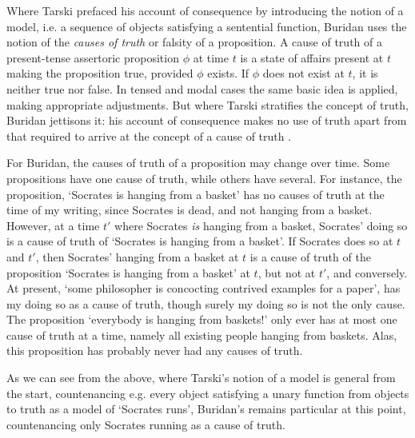 \documentclass[]{article}
\begin{document}
Where Tarski prefaced his account of consequence by introducing the notion of a model, i.e. a sequence of objects satisfying a sentential function, Buridan uses the notion of the \textit{causes of truth} or falsity of a proposition. A cause of truth of a present-tense assertoric proposition $\phi$ at time $t$ is a state of affairs present at $t$ making the proposition true, provided $\phi$ exists. If $\phi$ does not exist at $t$, it is neither true nor false. In tensed and modal cases the same basic idea is applied, making appropriate adjustments. But where Tarski stratifies the concept of truth, Buridan jettisons it: his account of consequence makes no use of truth apart from that required to arrive at the concept of a cause of truth \cite{Klima2008}. 

For Buridan, the causes of truth of a proposition may change over time. Some propositions have one cause of truth, while others have several. For instance, the proposition, `Socrates is hanging from a basket' has no causes of truth at the time of my writing, since Socrates is dead, and not hanging from a basket. However, at a time $t'$ where Socrates \textit{is} hanging from a basket, Socrates' doing so is a cause of truth of `Socrates is hanging from a basket'. If Socrates does so at $t$ and $t'$, then Socrates' hanging from a basket at $t$ is a cause of truth of the proposition `Socrates is hanging from a basket' at $t$, but not at $t'$, and conversely. At present, `some philosopher is concocting contrived examples for a paper', has my doing so as a cause of truth, though surely my doing so is not the only cause. The proposition `everybody is hanging from baskets!' only ever has at most one cause of truth at a time, namely all existing people hanging from baskets. Alas, this proposition has probably never had any causes of truth.

As we can see from the above, where Tarski's notion of a model is general from the start, countenancing e.g. every object satisfying a unary function from objects to truth as a model of `Socrates runs', Buridan's remains particular at this point, countenancing only Socrates running as a cause of truth.
\end{document}

